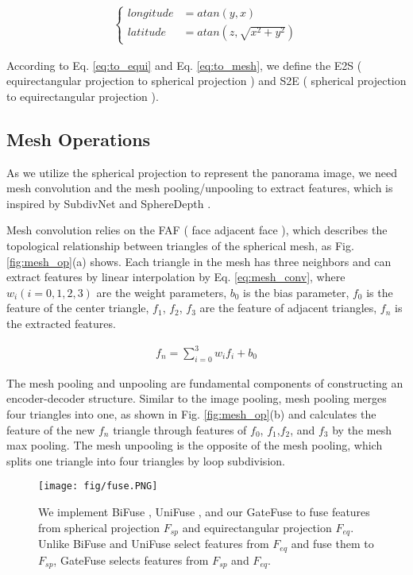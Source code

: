 \begin{align}
	\label{eq:to_mesh}
	\begin{cases}
		longitude &= atan(y,x) \\
		latitude &= atan(z,\sqrt{x^2+y^2})
	\end{cases}
\end{align}


According to Eq. \ref{eq:to_equi} and Eq. \ref{eq:to_mesh}, we define the E2S ( equirectangular projection to spherical projection ) and S2E ( spherical projection to equirectangular projection ).



\subsection{Mesh Operations}
\label{sec:mesh}

As we utilize the spherical projection to represent the panorama image, we need mesh convolution and the mesh pooling/unpooling to extract features, which is inspired by SubdivNet \cite{hu2021subdivision} and SphereDepth \cite{yan2022spheredepth}.

Mesh convolution relies on the FAF ( face adjacent face ), which describes the topological relationship between triangles of the spherical mesh, as Fig. \ref{fig:mesh_op}(a) shows. Each triangle in the mesh has three neighbors and can extract features by linear interpolation by Eq. \ref{eq:mesh_conv}, where $w_i (i=0,1,2,3)$ are the weight parameters, $b_0$ is the bias parameter, $f_0$ is the feature of the center triangle, $f_1$, $f_2$, $f_3$ are the feature of adjacent triangles, $f_n$ is the extracted features.

\begin{align}
	\label{eq:mesh_conv}
	f_{n}= \sum_{i=0}^{3}w_if_{i}+b_0
\end{align}

The mesh pooling and unpooling are fundamental components of constructing an encoder-decoder structure. 
Similar to the image pooling, mesh pooling merges four triangles into one, as shown in Fig. \ref{fig:mesh_op}(b) and calculates the feature of the new $f_{n}$ triangle through features of $f_0$, $f_1$,$f_2$, and $f_3$ by the mesh max pooling.
The mesh unpooling is the opposite of the mesh pooling, which splits one triangle into four triangles by loop subdivision.

\begin{figure*} [t]
	\begin{center}
		\texttt{[image: fig/fuse.PNG]}
	\end{center}
    \vspace{-1.5em}
	\caption{
		We implement BiFuse \cite{wang2020bifuse}, UniFuse \cite{jiang2021unifuse}, and our GateFuse to fuse features from spherical projection $F_{sp}$ and equirectangular projection $F_{eq}$. Unlike BiFuse and UniFuse select features from $F_{eq}$ and fuse them to $F_{sp}$, GateFuse selects features from $F_{sp}$ and $F_{eq}$.
	}
	\label{fig:fuse}
    \vspace{-1.5em}
\end{figure*}


